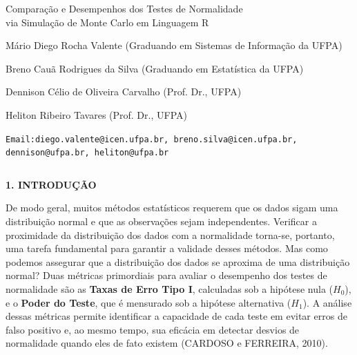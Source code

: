 \documentclass[final]{beamer}
\begin{document}
\begin{frame}[t]



\vspace*{7.0cm}
\centering
{ Comparação e Desempenhos dos Testes de Normalidade\\ 
  via Simulação de Monte Carlo em Linguagem R\par}
  
\vspace{0.8cm}
{ Mário Diego Rocha Valente (Graduando em Sistemas de Informação da UFPA)\par}

\vspace{0.8cm}
{ Breno Cauã Rodrigues da Silva (Graduando em Estatística da UFPA)\par}

\vspace{0.8cm}
{ Dennison Célio de Oliveira Carvalho (Prof. Dr., UFPA)\par}

\vspace{0.8cm}
{ Heliton Ribeiro Tavares (Prof. Dr., UFPA)\par}

{\texttt{Email:diego.valente@icen.ufpa.br, breno.silva@icen.ufpa.br, dennison@ufpa.br, heliton@ufpa.br  
}\par}
\vspace{3cm}

\begin{columns}[t,totalwidth=0.6\paperwidth]
  \hspace*{2.5cm}
  \begin{column}{0.45\paperwidth}


{\large\bfseries 1. INTRODUÇÃO}\par
\justifying
\vspace{1.3cm}

De modo geral, muitos métodos estatísticos requerem que os dados sigam uma distribuição normal e que as observações sejam independentes. Verificar a proximidade da distribuição dos dados com a normalidade torna-se, portanto, uma tarefa fundamental para garantir a validade desses métodos. Mas como podemos assegurar que a distribuição dos dados se aproxima de uma distribuição normal? Duas métricas primordiais para avaliar o desempenho dos testes de normalidade são as \textbf{Taxas de Erro Tipo I}, calculadas sob a hipótese nula ($H_0$), e o \textbf{Poder do Teste}, que é mensurado sob a hipótese alternativa ($H_1$). A análise dessas métricas permite identificar a capacidade de cada teste em evitar erros de falso positivo e, ao mesmo tempo, sua eficácia em detectar desvios de normalidade quando eles de fato existem (CARDOSO e FERREIRA, 2010).


\end{column}
\end{columns}
\end{frame}
\end{document}
